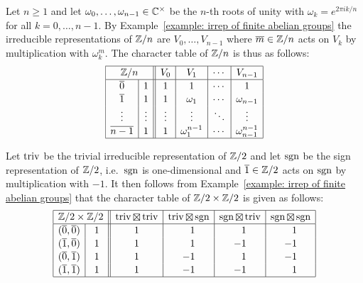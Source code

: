 \begin{example}
  Let $n \geq 1$ and let $\omega_0, \dotsc, \omega_{n-1} \in \mathbb{C}^\times$ be the $n$-th roots of unity with $\omega_k = e^{2 \pi i k / n}$ for all $k = 0, \dotsc, n-1$.
  By Example~\ref{example: irrep of finite abelian groups} the irreducible representations of $\mathbb{Z}/n$ are $V_0, \dotsc, V_{n-1}$ where $\overline{m} \in \mathbb{Z}/n$ acts on $V_k$ by multiplication with $\omega_k^m$.
  The character table of $\mathbb{Z}/n$ is thus as follows:
  \[
    \begin{array}{|c|c||c|c|c|c|}
      \hline
        \multicolumn{2}{|c||}{\Integer/n}
      & V_0
      & V_1
      & \cdots
      & V_{n-1}
      \\
      \hline
        \class{0}
      & 1
      & 1
      & 1
      & \cdots
      & 1
      \\
        \class{1}
      & 1
      & 1
      & \omega_1
      & \cdots
      & \omega_{n-1}
      \\
        \vdots
      & \vdots
      & \vdots
      & \vdots
      & \ddots
      & \vdots
      \\
        \class{n-1}
      & 1
      & 1
      & \omega_1 ^{n-1}
      & \cdots
      & \omega_{n-1}^{n-1}
      \\
      \hline
    \end{array}
  \]
\end{example}


\begin{example}
  Let $\operatorname{triv}$ be the trivial irreducible representation of $\mathbb{Z}/2$ and let $\operatorname{sgn}$ be the sign representation of $\mathbb{Z}/2$, i.e.\ $\operatorname{sgn}$ is one-dimensional and $\overline{1} \in \mathbb{Z}/2$ acts on $\operatorname{sgn}$ by multiplication with $-1$.
  It then follows from Example~\ref{example: irrep of finite abelian groups} that the character table of $\mathbb{Z}/2 \times \mathbb{Z}/2$ is given as follows:
  \[
    \begingroup
    \renewcommand{\arraystretch}{1.1}
    \begin{array}{|c|c||c|c|c|c|}
      \hline
        \multicolumn{2}{|c||}{ \Integer/2 \times \Integer/2 }
      & \triv \outertensor \triv
      & \triv \outertensor \sgn
      & \sgn \outertensor \triv
      & \sgn \outertensor \sgn
      \\
      \hline
        (\class{0},\class{0})
      & 1
      &            1
      & \phantom{-}1
      & \phantom{-}1
      & \phantom{-}1
      \\
        (\class{1},\class{0})
      & 1
      &            1
      & \phantom{-}1
      &           -1
      &           -1
      \\
        (\class{0},\class{1})
      & 1
      &            1
      &           -1
      & \phantom{-}1
      &           -1
      \\
        (\class{1},\class{1})
      & 1
      &            1
      &           -1
      &           -1
      & \phantom{-}1
      \\
      \hline
    \end{array}
    \endgroup
  \]
\end{example}


